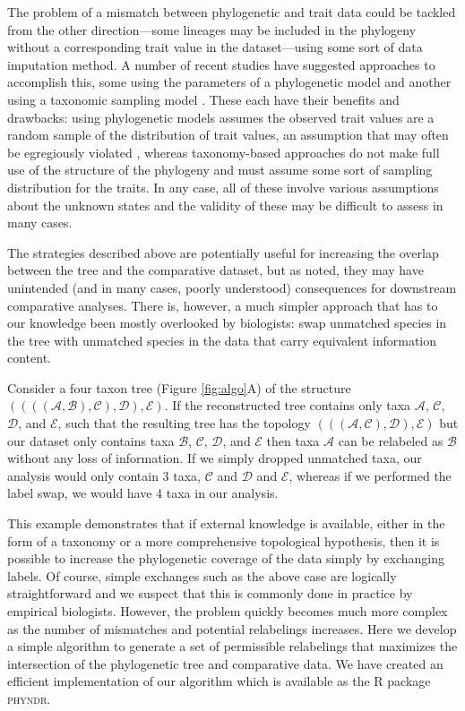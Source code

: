 \documentclass[a4paper,11pt]{article}
\begin{document}
The problem of a mismatch between phylogenetic and trait data could be tackled from the other direction---some lineages may be included in the phylogeny without a corresponding trait value in the dataset---using some sort of data imputation method. A number of recent studies have suggested approaches to accomplish this, some using the parameters of a phylogenetic model \citep{Fagan2013, Swenson2014, PEM} and another using a taxonomic sampling model \citep{FitzJohn2014}. These each have their benefits and drawbacks: using phylogenetic models assumes the observed trait values are a random sample of the distribution of trait values, an assumption that may often be egregiously violated \citep{FitzJohn2014}, whereas taxonomy-based approaches do not make full use of the structure of the phylogeny and must assume some sort of sampling distribution for the traits. In any case, all of these involve various assumptions about the unknown states and the validity of these may be difficult to assess in many cases.

The strategies described above are potentially useful for increasing the overlap between the tree and the comparative dataset, but as noted, they may have unintended (and in many cases, poorly understood) consequences for downstream comparative analyses. There is, however, a much simpler approach that has to our knowledge been mostly overlooked by biologists: swap unmatched species in the tree with unmatched species in the data that carry equivalent information content. 

Consider a four taxon tree (Figure \ref{fig:algo}A) of the structure $((((\mathcal{A},\mathcal{B}),\mathcal{C}),\mathcal{D}),\mathcal{E})$. If the reconstructed tree contains only taxa $\mathcal{A}$, $\mathcal{C}$, $\mathcal{D}$, and $\mathcal{E}$, such that the resulting tree has the topology $(((\mathcal{A},\mathcal{C}),\mathcal{D}),\mathcal{E})$ but our dataset only contains taxa $\mathcal{B}$, $\mathcal{C}$, $\mathcal{D}$, and $\mathcal{E}$  then taxa $\mathcal{A}$ can be relabeled as  $\mathcal{B}$  without any loss of information. If we simply dropped unmatched taxa, our analysis would only contain 3 taxa, $\mathcal{C}$ and $\mathcal{D}$ and $\mathcal{E}$, whereas if we performed the label swap, we would have 4 taxa in our analysis.

This example demonstrates that if external knowledge is available, either in the form of a taxonomy or a more comprehensive topological hypothesis, then it is possible to increase the phylogenetic coverage of the data simply by exchanging labels. Of course, simple exchanges such as the above case are logically straightforward and we suspect that this is commonly done in practice by empirical biologists. However, the problem quickly becomes much more complex as the number of mismatches and potential relabelings increases. Here we develop a simple algorithm to generate a set of permissible relabelings that maximizes the intersection of the phylogenetic tree and comparative data. We have created an efficient implementation of our algorithm which is available as the R package \textsc{phyndr}. 
\end{document}
